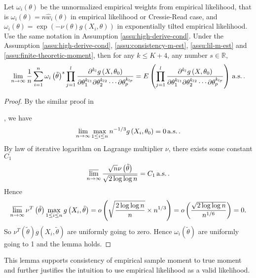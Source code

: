 \begin{lem}
\label{lem:finite-empirical weight moment}Let $\omega_{i}\left(\theta\right)$
be the unnormalized empirical weights from empirical likelihood, that
is $\omega_{i}\left(\theta\right)=n\hat{w}_{i}\left(\theta\right)$
in empirical likelihood or Cressie-Read case, and $\omega_{i}\left(\theta\right)=\exp\left(-\nu\left(\theta\right)g\left(X_{i},\theta\right)\right)$
in exponentially tilted empirical likelihood. Use the same notation
in Assumption \ref{assu:high-derive-cond}. Under the Assumption \ref{assu:high-derive-cond},
\ref{assu:consistency-m-est}, \ref{assu:lil-m-est} and \ref{assu:finite-theoretic-moment},
then for any $k\le K+4$, any number $s\in\mathbb{R}$, 
\[
\lim_{n\rightarrow\infty}\frac{1}{n}\sum_{i=1}^{n}\omega_{i}\left(\tilde{\theta}\right)^{s}\prod_{j=1}^{l}\frac{\partial^{k_{l}}g\left(X,\theta_{0}\right)}{\partial\theta_{1}^{k_{l1}}\partial\theta_{2}^{k_{l2}}\cdots\partial\theta_{p}^{k_{lp}}}=E\left(\prod_{j=1}^{l}\frac{\partial^{k_{l}}g\left(X,\theta_{0}\right)}{\partial\theta_{1}^{k_{l1}}\partial\theta_{2}^{k_{l2}}\cdots\partial\theta_{p}^{k_{lp}}}\right)\,\mathrm{a.s.}\,.
\]
\end{lem}
\begin{proof}
By the similar proof in %
\begin{comment}
add detail lemma number
\end{comment}
{} \citet{owen2010empirical}, we have 
\[
\lim_{n\rightarrow\infty}\max_{1\le i\le n}n^{-1/3}g\left(X_{i},\theta_{0}\right)=0\,\mathrm{a.s.}\,.
\]
By law of iterative logarithm on Lagrange multiplier $\nu$, there
exists some constant $C_{1}$ 
\[
\varlimsup_{n\rightarrow\infty}\frac{\sqrt{n}\nu\left(\tilde{\theta}\right)}{\sqrt{2\log\log n}}=C_{1}\,\mathrm{a.s.}\,.
\]
Hence 
\[
\varlimsup_{n\rightarrow\infty}\nu^{T}\left(\tilde{\theta}\right)\max_{1\le i\le n}g\left(X_{i},\tilde{\theta}\right)=o\left(\sqrt{\frac{2\log\log n}{n}}\times n^{1/3}\right)=o\left(\frac{\sqrt{2\log\log n}}{n^{1/6}}\right)=0.
\]
So $\nu^{T}\left(\tilde{\theta}\right)g\left(X_{i},\tilde{\theta}\right)$
are uniformly going to zero. Hence $\omega_{i}\left(\tilde{\theta}\right)$
are uniformly going to 1 and the lemma holds.
\end{proof}
This lemma supports consistency of empirical sample moment to true
moment and further justifies the intuition to use empirical likelihood
as a valid likelihood. 

